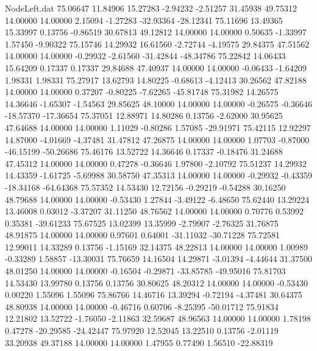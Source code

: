 \begin{filecontents}{NodeLeft.dat}
  75.06647   11.84906   15.27283    -2.94232   -2.51257   31.45938   49.75312   14.00000   14.00000    2.15094   -1.27283  -32.93364  -28.12341
  75.11696   13.49365   15.33997     0.13756   -0.86519   30.67813   49.12812   14.00000   14.00000    0.50635   -1.33997    1.57450   -9.90322
  75.15746   14.29932   16.61560    -2.72744   -4.19575   29.84375   47.51562   14.00000   14.00000   -0.29932   -2.61560  -31.42844  -48.34786
  75.22842   14.06433   15.64209     0.17337    0.17337   29.84688   47.40937   14.00000   14.00000   -0.06433   -1.64209    1.98331    1.98331
  75.27917   13.62793   14.80225    -0.68613   -4.12413   30.26562   47.82188   14.00000   14.00000    0.37207   -0.80225   -7.62265  -45.81748
  75.31982   14.26575   14.36646    -1.65307   -1.54563   29.85625   48.10000   14.00000   14.00000   -0.26575   -0.36646  -18.57370  -17.36654
  75.37051   12.88971   14.80286     0.13756   -2.62000   30.95625   47.64688   14.00000   14.00000    1.11029   -0.80286    1.57085  -29.91971
  75.42115   12.92297   14.87000    -4.01669   -4.37481   31.47812   47.26875   14.00000   14.00000    1.07703   -0.87000  -46.15199  -50.26686
  75.46176   13.52722   14.36646     0.17337   -0.18476   31.24688   47.45312   14.00000   14.00000    0.47278   -0.36646    1.97800   -2.10792
  75.51237   14.29932   14.43359    -1.61725   -5.69988   30.58750   47.35313   14.00000   14.00000   -0.29932   -0.43359  -18.34168  -64.64368
  75.57352   14.53430   12.72156    -0.29219   -0.54288   30.16250   48.79688   14.00000   14.00000   -0.53430    1.27844   -3.49122   -6.48650
  75.62440   13.29224   13.46008     0.03012   -3.37207   31.11250   48.76562   14.00000   14.00000    0.70776    0.53992    0.35381  -39.61233
  75.67525   13.02399   13.35999    -2.79907   -2.76325   31.76875   48.91875   14.00000   14.00000    0.97601    0.64001  -31.11032  -30.71228
  75.72581   12.99011   14.33289     0.13756   -1.15169   32.14375   48.22813   14.00000   14.00000    1.00989   -0.33289    1.58857  -13.30031
  75.76659   14.16504   14.29871    -3.01394   -4.44644   31.37500   48.01250   14.00000   14.00000   -0.16504   -0.29871  -33.85785  -49.95016
  75.81703   14.53430   13.99780     0.13756    0.13756   30.80625   48.20312   14.00000   14.00000   -0.53430    0.00220    1.55096    1.55096
  75.86766   14.46716   13.39294    -0.72194   -4.37481   30.64375   48.80938   14.00000   14.00000   -0.46716    0.60706   -8.25395  -50.01712
  75.91834   12.21802   13.52722    -1.76050   -2.11863   32.59687   48.96563   14.00000   14.00000    1.78198    0.47278  -20.29585  -24.42447
  75.97920   12.52045   13.22510     0.13756   -2.01119   33.20938   49.37188   14.00000   14.00000    1.47955    0.77490    1.56510  -22.88319

\end{filecontents}

